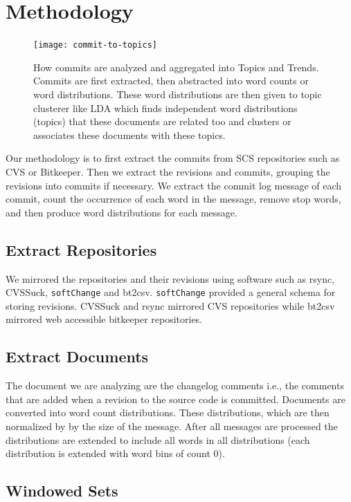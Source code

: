 \documentclass[times, 10pt,twocolumn]{article}
\begin{document}
\section{Methodology}
\begin{figure}
  \centering
  \texttt{[image: commit-to-topics]} 
  \caption{How commits are analyzed and aggregated into Topics and Trends. Commits are first extracted, then abstracted into word counts or word distributions. These word distributions are then given to topic clusterer like LDA which finds independent word distributions (topics) that these documents are related too and clusters or associates these documents with these topics.}
  \label{fig:commits}
\end{figure}

Our methodology is to first extract the commits from SCS repositories such
as CVS or Bitkeeper. Then we extract the revisions and commits,
grouping the revisions into commits if necessary. We extract the
commit log message of each commit, count the occurrence of each word in
the message, remove stop words, and then produce word distributions
for each message.


\subsection{Extract Repositories}

We mirrored the repositories and their revisions using software such
as rsync, CVSSuck, \texttt{softChange} and bt2csv.
\texttt{softChange} provided a general schema for storing
revisions. CVSSuck and rsync mirrored CVS repositories while bt2csv
mirrored web accessible bitkeeper repositories.


\subsection{Extract Documents}

The document we are analyzing are the changelog comments i.e., the comments that are added  when a revision to the source code is committed.
Documents are converted into word count distributions. These
distributions, which are then normalized by by the size of the
message. After all messages are processed the distributions are
extended to include all words in all distributions (each distribution
is extended with word bins of count 0).

\subsection{Windowed Sets}
\end{document}
